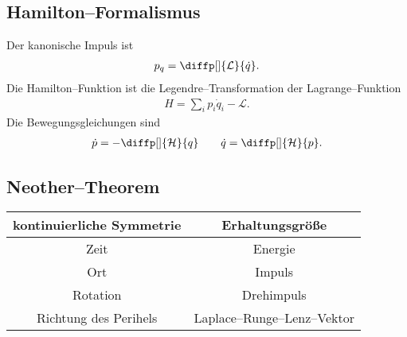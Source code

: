 \documentclass[a4paper,12pt]{article}
\numberwithin{equation}{section}
\begin{document}
\subsection{Hamilton--Formalismus}
Der kanonische Impuls ist
\begin{align} 
        p_q=\diffp[]{\mathcal{L}}{\dot{q}}
.\end{align} 
Die Hamilton--Funktion ist die Legendre--Transformation der Lagrange--Funktion
\begin{align} 
        H=\sum_{i}^{}p_i\dot{q}_i-\mathcal{L}
.\end{align} 
Die Bewegungsgleichungen sind
\begin{align} 
        \dot{p}=-\diffp[]{\mathcal{H}}{q}\qquad \dot{q}=\diffp[]{\mathcal{H}}{p}
.\end{align} 

\subsection{Neother--Theorem}
{
        \centering
        \begin{tabulary}{\textwidth}{c|c}
                kontinuierliche Symmetrie&Erhaltungsgröße\\
                \hline
                Zeit&Energie\\
                Ort&Impuls\\
                Rotation&Drehimpuls\\
                Richtung des Perihels&Laplace--Runge--Lenz--Vektor
        \end{tabulary}
\par}

\end{document}
